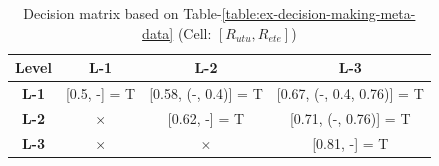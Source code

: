 \begin{table}
    \begin{tabular}{ |c|c|c|c| }
        \hline
        \textbf{Level} & \textbf{L-1} & \hspace*{4.1mm}\textbf{L-2}\hspace*{4.1mm} & \hspace*{4.1mm}\textbf{L-3}\hspace*{4.1mm} \\
        \hline
        \textbf{L-1} & [0.5, -] = T & [0.58, (-, 0.4)] = T & [0.67, (-, 0.4, 0.76)] = T \\
        \hline
        \textbf{L-2} & $\times$ & [0.62, -] = T & [0.71, (-, 0.76)] = T \\
        \hline
        \textbf{L-3} &  $\times$ &  $\times$ & [0.81, -] = T \\
        \hline
    \end{tabular}
    \caption{Decision matrix based on Table-\ref{table:ex-decision-making-meta-data} (Cell: $[R_{utu}, R_{ete}]$)}
    \label{table:ex-decision-matrix}
\end{table}

